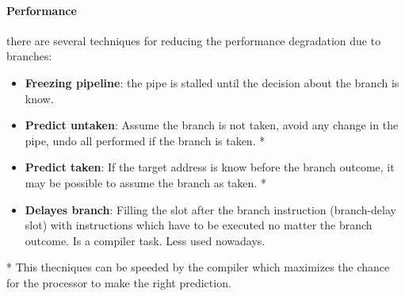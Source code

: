 \documentclass[12pt]{article}
\begin{document}
\paragraph{Performance} there are several techniques for reducing the performance degradation due to branches:
\begin{itemize}
  \item \textbf{Freezing pipeline}: the pipe is stalled until the decision about the branch is know.
  \item \textbf{Predict untaken}: Assume the branch is not taken, avoid any change in the pipe, undo all performed if the branch is taken. *
  \item \textbf{Predict taken}: If the target address is know before the branch outcome, it may be possible to assume the branch as taken. *
  \item \textbf{Delayes branch}: Filling the slot after the branch instruction (branch-delay slot) with instructions which have to be executed no matter the branch outcome. Is a compiler task. Less used nowadays.
\end{itemize}
* This thecniques can be speeded by the compiler which maximizes the chance for the processor to make the right prediction.\\
\end{document}
